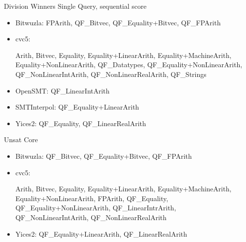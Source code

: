 \documentclass[table]{beamer}
\def\emph#1{\textcolor{MYblue}{#1}}
\begin{document}
\begin{frame}{Division Winners}
  \pause
  \emph{Single Query, sequential score}
  \begin{itemize}
  \item \emph{Bitwuzla}: {\small FPArith, QF\_Bitvec, QF\_Equality+Bitvec, QF\_FPArith}

  \item \emph{cvc5}: \begin{minipage}{.8\textwidth}\raggedright \tiny Arith,
    Bitvec, Equality, Equality+LinearArith, Equality+MachineArith,
    Equality+NonLinearArith, QF\_Datatypes, QF\_Equality+NonLinearArith, QF\_NonLinearIntArith, QF\_NonLinearRealArith, QF\_Strings\end{minipage}

  \item \emph{OpenSMT}: {\small QF\_LinearIntArith}

  \item \emph{SMTInterpol}: {\small QF\_Equality+LinearArith}

  \item \emph{Yices2}: {\small QF\_Equality, QF\_LinearRealArith}
  \end{itemize}

  \medskip

  \pause
  \emph{Unsat Core}
  \begin{itemize}
  \item \emph{Bitwuzla}: {\small QF\_Bitvec, QF\_Equality+Bitvec, QF\_FPArith}
  \item \emph{cvc5}: \begin{minipage}{.8\textwidth}\raggedright \tiny Arith, Bitvec, Equality, Equality+LinearArith, Equality+MachineArith, Equality+NonLinearArith, FPArith, QF\_Equality, QF\_Equality+NonLinearArith, QF\_LinearIntrArith, QF\_NonLinearIntArith, QF\_NonLinearRealArith \end{minipage}
  \item \emph{Yices2}: {\small QF\_Equality+LinearArith, QF\_LinearRealArith}
  \end{itemize}

\end{frame}
\end{document}
